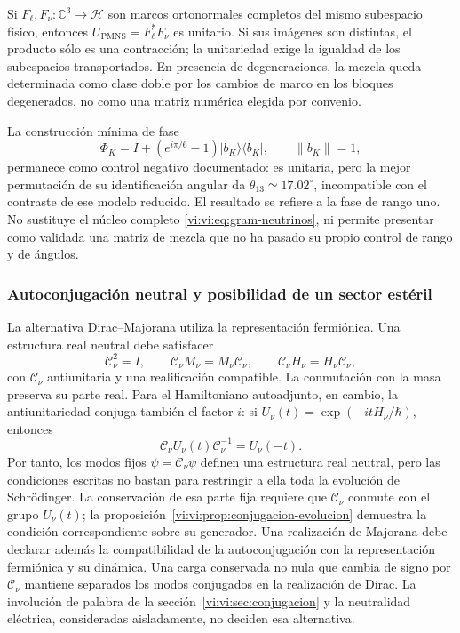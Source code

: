 Si \(F_\ell,F_\nu:\mathbb C^3\to\mathcal H\) son marcos ortonormales
completos del mismo subespacio físico, entonces
\(U_{\mathrm{PMNS}}=F_\ell^*F_\nu\) es unitario. Si sus imágenes son
distintas, el producto sólo es una contracción; la unitariedad exige la
igualdad de los subespacios transportados. En presencia de degeneraciones,
la mezcla queda determinada como clase doble por los cambios de marco en
los bloques degenerados, no como una matriz numérica elegida por convenio.

La construcción mínima de fase
\[
 \Phi_K=I+(e^{i\pi/6}-1)|b_K\rangle\langle b_K|,
 \qquad\|b_K\|=1,
\]
permanece como control negativo documentado: es unitaria, pero la mejor
permutación de su identificación angular da
\(\theta_{13}\simeq17.02^\circ\), incompatible con el contraste de ese
modelo reducido. El resultado se refiere a la fase de rango uno. No
sustituye el núcleo completo \eqref{vi:vi:eq:gram-neutrinos}, ni permite
presentar como validada una matriz de mezcla que no ha pasado su propio
control de rango y de ángulos.

\subsubsection{Autoconjugación neutral y posibilidad de un sector estéril}

La alternativa Dirac--Majorana utiliza la representación fermiónica. Una
estructura real neutral debe satisfacer
\[
 \mathcal C_\nu^2=I,\qquad
 \mathcal C_\nu M_\nu=M_\nu\mathcal C_\nu,\qquad
 \mathcal C_\nu H_\nu=H_\nu\mathcal C_\nu,
\]
con \(\mathcal C_\nu\) antiunitaria y una realificación compatible.
La conmutación con la masa preserva su parte real. Para el Hamiltoniano
autoadjunto, en cambio, la antiunitariedad conjuga también el factor
\(i\): si \(U_\nu(t)=\exp(-itH_\nu/\hbar)\), entonces
\[
 \mathcal C_\nu U_\nu(t)\mathcal C_\nu^{-1}=U_\nu(-t).
\]
Por tanto, los modos fijos \(\psi=\mathcal C_\nu\psi\) definen una
estructura real neutral, pero las condiciones escritas no bastan para
restringir a ella toda la evolución de Schr\"odinger. La conservación de
esa parte fija requiere que \(\mathcal C_\nu\) conmute con el grupo
\(U_\nu(t)\); la proposición~\ref{vi:vi:prop:conjugacion-evolucion}
demuestra la condición correspondiente sobre su generador. Una
realización de Majorana debe declarar además la compatibilidad de la
autoconjugación con la representación fermiónica y su dinámica.
Una carga conservada no nula que cambia
de signo por \(\mathcal C_\nu\) mantiene separados los modos conjugados
en la realización de Dirac. La involución de palabra de la
sección~\ref{vi:vi:sec:conjugacion} y la neutralidad eléctrica, consideradas
aisladamente, no deciden esa alternativa.


